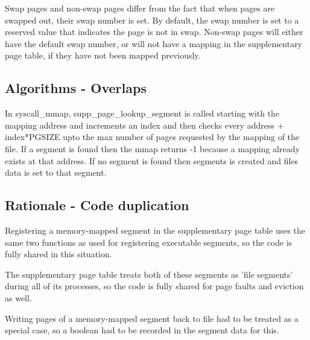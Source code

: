Swap pages and non-swap pages differ from the fact that when pages are swapped
out, their swap number is set. By default, the swap number is set to a reserved
value that indicates the page is not in swap. Non-swap pages will either have
the default swap number, or will not have a mapping in the supplementary page
table, if they have not been mapped previously.

\subsection{Algorithms - Overlaps}


In syscall\_mmap, supp\_page\_lookup\_segment is called starting with the mapping address and increments an index and then checks every address + index*PGSIZE upto the max number of pages requested by the mapping of the file. If a segment is found then the mmap returns -1 because a mapping already exists at that address. If no segment is found then segments is created and files data is set to that segment.

\subsection{Rationale - Code duplication}


Registering a memory-mapped segment in the supplementary page table uses the
same two functions as used for registering executable segments, so the code is
fully shared in this situation.

The supplementary page table treats both of these segments as 'file segments'
during all of its processes, so the code is fully shared for page faults and
eviction as well.

Writing pages of a memory-mapped segment back to file had to be treated as a
special case, so a boolean had to be recorded in the segment data for this.
